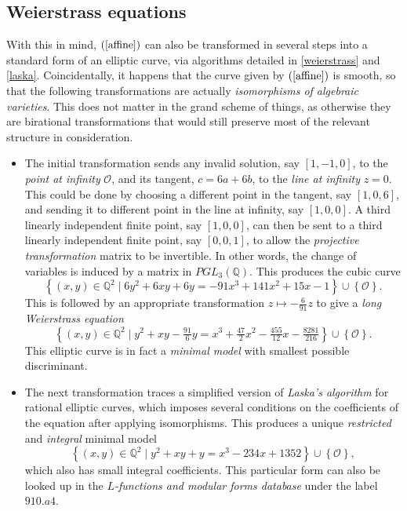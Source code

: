 \documentclass{article}
\newcommand{\rb}[1]{\left( #1 \right)}
\renewcommand{\sb}[1]{\left[ #1 \right]}
\newcommand{\cb}[1]{\left\{ #1 \right\}}
\newcommand{\Q}{\mathbb{Q}}
\newcommand{\OO}{\mathcal{O}}
\begin{document}
\subsection{Weierstrass equations}

With this in mind, $ \rb{\ref{affine}} $ can also be transformed in several steps into a standard form of an elliptic curve, via algorithms detailed in \ref{weierstrass} and \ref{laska}. Coincidentally, it happens that the curve given by $ \rb{\ref{affine}} $ is smooth, so that the following transformations are actually \emph{isomorphisms of algebraic varieties}. This does not matter in the grand scheme of things, as otherwise they are birational transformations that would still preserve most of the relevant structure in consideration.
\begin{itemize}
\item The initial transformation sends any invalid solution, say $ \sb{1, -1, 0} $, to the \emph{point at infinity} $ \OO $, and its tangent, $ c = 6a + 6b $, to the \emph{line at infinity} $ z = 0 $. This could be done by choosing a different point in the tangent, say $ \sb{1, 0, 6} $, and sending it to different point in the line at infinity, say $ \sb{1, 0, 0} $. A third linearly independent finite point, say $ \sb{1, 0, 0} $, can then be sent to a third linearly independent finite point, say $ \sb{0, 0, 1} $, to allow the \emph{projective transformation} matrix to be invertible. In other words, the change of variables is induced by a matrix in $ PGL_3\rb{\Q} $. This produces the cubic curve
$$ \cb{\rb{x, y} \in \Q^2 \mid 6y^2 + 6xy + 6y = -91x^3 + 141x^2 + 15x - 1} \cup \cb{\OO}. $$
This is followed by an appropriate transformation $ z \mapsto -\tfrac{6}{91}z $ to give a \emph{long Weierstrass equation}
$$ \cb{\rb{x, y} \in \Q^2 \mid y^2 + xy - \tfrac{91}{6}y = x^3 + \tfrac{47}{2}x^2 - \tfrac{455}{12}x - \tfrac{8281}{216}} \cup \cb{\OO}. $$
This elliptic curve is in fact a \emph{minimal model} with smallest possible discriminant.
\item The next transformation traces a simplified version of \emph{Laska's algorithm} for rational elliptic curves, which imposes several conditions on the coefficients of the equation after applying isomorphisms. This produces a unique \emph{restricted} and \emph{integral} minimal model
$$ \cb{\rb{x, y} \in \Q^2 \mid y^2 + xy + y = x^3 - 234x + 1352} \cup \cb{\OO}, $$
which also has small integral coefficients. This particular form can also be looked up in the \emph{$ L $-functions and modular forms database} under the label $ 910.a4 $.

\end{itemize}
\end{document}
